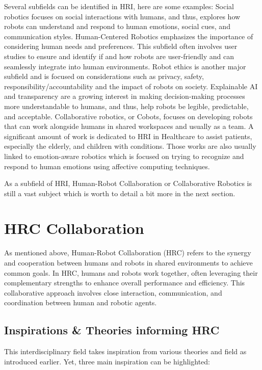 Several subfields can be identified in HRI, here are some examples:
Social robotics focuses on social interactions with humans, and thus, explores how robots can understand and respond to human emotions, social cues, and communication styles.
Human-Centered Robotics emphasizes the importance of considering human needs and preferences. This subfield often involves user studies to ensure and identify if and how robots are user-friendly and can seamlessly integrate into human environments.
Robot ethics is another major subfield and is focused on considerations such as privacy, safety, responsibility/accountability and the impact of robots on society.
Explainable AI and transparency are a growing interest in making decision-making processes more understandable to humans, and thus, help robots be legible, predictable, and acceptable.
Collaborative robotics, or Cobots, focuses on developing robots that can work alongside humans in shared workspaces and usually as a team.
A significant amount of work is dedicated to HRI in Healthcare to assist patients, especially the elderly, and children with conditions. Those works are also usually linked to emotion-aware robotics which is focused on trying to recognize and respond to human emotions using affective computing techniques.   

As a subfield of HRI, Human-Robot Collaboration or Collaborative Robotics is still a vast subject which is worth to detail a bit more in the next section.

\section{HRC Collaboration}

As mentioned above, Human-Robot Collaboration (HRC) refers to the synergy and cooperation between humans and robots in shared environments to achieve common goals. In HRC, humans and robots work together, often leveraging their complementary strengths to enhance overall performance and efficiency. This collaborative approach involves close interaction, communication, and coordination between human and robotic agents.

\subsection{Inspirations \& Theories informing HRC}

This interdisciplinary field takes inspiration from various theories and field as introduced earlier. Yet, three main inspiration can be highlighted:

